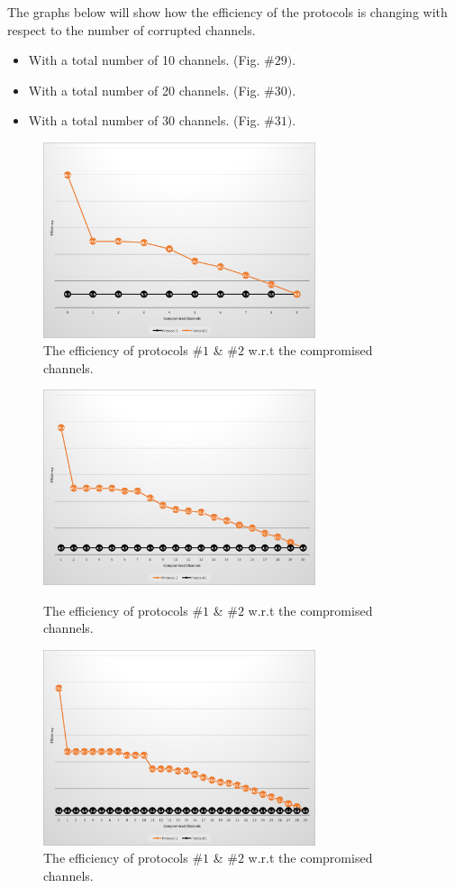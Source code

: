 \documentclass[main.tex]{subfiles}
\begin{document}
 The graphs below will show how the efficiency of the protocols is changing with respect to the number of corrupted channels.\begin{itemize}
 \item With a total number of 10 channels. (Fig. $\#29)$. 
  \item With a total number of 20 channels. (Fig. $\#30)$.
   \item With a total number of 30 channels. (Fig. $\#31)$.\end{itemize}\begin{figure} [!htb]\centering
 \includegraphics[keepaspectratio, width=8cm]{pics/10Eff.png}
 \caption{The efficiency of protocols $\#1$ \& $\#2$ w.r.t the compromised channels.}\end{figure}
\begin{figure} [!htb]\centering 
\centering
 \includegraphics[keepaspectratio, width=8cm]{pics/20Eff.png}
 \caption{The efficiency of protocols $\#1$ \& $\#2$ w.r.t the compromised channels.}%
\centering
 \includegraphics[keepaspectratio, width=8cm]{pics/30eff.png}
 \caption{The efficiency of protocols $\#1$ \& $\#2$ w.r.t the compromised channels.}\end{figure}
\end{document}
